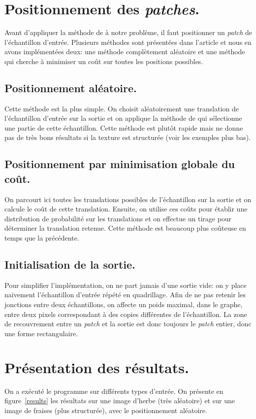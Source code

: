 \documentclass[a4paper, 12pt]{article}
\begin{document}
\section{Positionnement des \emph{patches}.}
Avant d'appliquer la méthode de \grc{} à notre problème, il faut positionner un \emph{patch} de l'échantillon d'entrée.
Plusieurs méthodes sont présentées dans l'article et nous en avons implémentées deux:
une méthode complètement aléatoire et une méthode qui cherche à minimiser un coût sur toutes les positions possibles.

\subsection{Positionnement aléatoire.}
Cette méthode est la plus simple.
On choisit aléatoirement une translation de l'échantillon d'entrée sur la sortie et on applique la méthode de \grc{} qui sélectionne une partie de cette échantillon.
Cette méthode est plutôt rapide mais ne donne pas de très bons résultats si la texture est structurée (voir les exemples plus bas).

\subsection{Positionnement par minimisation globale du coût.}
On parcourt ici toutes les translations possibles de l'échantillon sur la sortie et on calcule le coût de cette translation.
Ensuite, on utilise ces coûts pour établir une distribution de probabilité sur les translations et on effectue un tirage pour déterminer la translation retenue.
Cette méthode est beaucoup plus coûteuse en temps que la précédente.

\subsection{Initialisation de la sortie.}
Pour simplifier l'implémentation, on ne part jamais d'une sortie vide: on y place naïvement l'échantillon d'entrée répété en quadrillage.
Afin de ne pas retenir les jonctions entre deux échantillons, on affecte un poids maximal, dans le graphe, entre deux pixels correspondant à des copies différentes de l'échantillon.
La zone de recouvrement entre un \emph{patch} et la sortie est donc toujours le \emph{patch} entier, donc une forme rectangulaire.


\section{Présentation des résultats.}
On a exécuté le programme sur différents types d'entrée.
On présente en figure~\vref{results} les résultats sur une image d'herbe (très aléatoire) et sur une image de fraises (plus structurée), avec le positionnement aléatoire.
\end{document}
